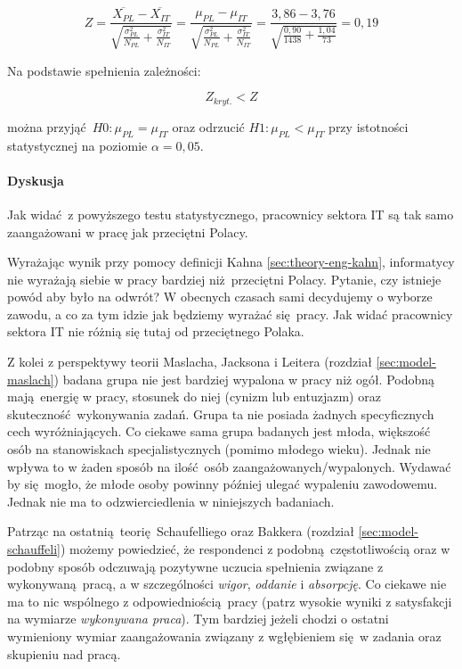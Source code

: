 \begin{equation}
  Z = \frac{\overline{X_{PL}} - \overline{X_{IT}}}{\sqrt{\frac{\sigma^2_{PL}}{N_{PL}}+\frac{\sigma^2_{IT}}{N_{IT}}}} = \frac{\mu_{PL} - \mu_{IT}}{\sqrt{\frac{\sigma^2_{PL}}{N_{PL}}+\frac{\sigma^2_{IT}}{N_{IT}}}} = \frac{3,86- 3,76}{\sqrt{\frac{0,90}{1438}+\frac{1,04}{73}}} = 0,19
\end{equation}

Na podstawie spełnienia zależności:

\begin{equation}
  Z_{kryt.} < Z
\end{equation}

można przyjąć $H0: \mu_{PL} = \mu_{IT}$ oraz odrzucić $H1: \mu_{PL} < \mu_{IT}$ przy istotności statystycznej na poziomie $\alpha = 0,05$.

\paragraph{Dyskusja}
Jak widać z powyższego testu statystycznego, pracownicy sektora IT są tak samo zaangażowani w pracę jak przeciętni Polacy.

Wyrażając wynik przy pomocy definicji Kahna \ref{sec:theory-eng-kahn}, informatycy nie wyrażają siebie w pracy bardziej niż przeciętni Polacy. Pytanie, czy istnieje powód aby było na odwrót? W obecnych czasach sami decydujemy o wyborze zawodu, a co za tym idzie jak będziemy wyrażać się pracy. Jak widać pracownicy sektora IT nie różnią się tutaj od przeciętnego Polaka.

Z kolei z perspektywy teorii Maslacha, Jacksona i Leitera (rozdział \ref{sec:model-maslach}) badana grupa nie jest bardziej wypalona w pracy niż ogół. Podobną mają energię w pracy, stosunek do niej (cynizm lub entuzjazm) oraz skuteczność wykonywania zadań. Grupa ta nie posiada żadnych specyficznych cech wyróżniających. Co ciekawe sama grupa badanych jest młoda, większość osób na stanowiskach specjalistycznych (pomimo młodego wieku). Jednak nie wpływa to w żaden sposób na
ilość osób zaangażowanych/wypalonych. Wydawać by się mogło, że młode osoby powinny później ulegać wypaleniu zawodowemu. Jednak nie ma to odzwierciedlenia w niniejszych badaniach.

Patrząc na ostatnią teorię Schaufelliego oraz Bakkera (rozdział \ref{sec:model-schauffeli}) możemy powiedzieć, że respondenci z podobną częstotliwością oraz w podobny sposób odczuwają pozytywne uczucia spełnienia związane z wykonywaną pracą, a w szczególności \textit{wigor}, \textit{oddanie} i \textit{absorpcję}. Co ciekawe nie ma to nic wspólnego z odpowiedniością pracy (patrz wysokie wyniki z satysfakcji na wymiarze \textit{wykonywana praca}). Tym bardziej
jeżeli chodzi o ostatni wymieniony wymiar zaangażowania związany z wgłębieniem się w zadania oraz skupieniu nad pracą.
